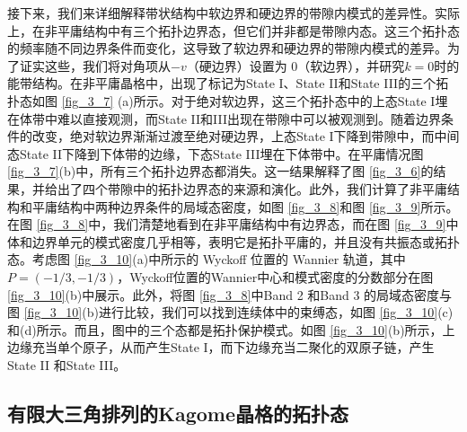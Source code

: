 接下来，我们来详细解释带状结构中软边界和硬边界的带隙内模式的差异性。实际上，在非平庸结构中有三个拓扑边界态，但它们并非都是带隙内态。这三个拓扑态的频率随不同边界条件而变化，这导致了软边界和硬边界的带隙内模式的差异。为了证实这些，我们将对角项从$-v$（硬边界）设置为 0（软边界），并研究$ k = 0 $时的能带结构。在非平庸晶格中，出现了标记为State I、State II和State III的三个拓扑态如图 \ref{fig_3_7} (a)所示。对于绝对软边界，这三个拓扑态中的上态State I埋在体带中难以直接观测，而State II和III出现在带隙中可以被观测到。随着边界条件的改变，绝对软边界渐渐过渡至绝对硬边界，上态State I下降到带隙中，而中间态State II下降到下体带的边缘，下态State III埋在下体带中。在平庸情况图 \ref{fig_3_7}(b)中，所有三个拓扑边界态都消失。这一结果解释了图 \ref{fig_3_6}的结果，并给出了四个带隙中的拓扑边界态的来源和演化。此外，我们计算了非平庸结构和平庸结构中两种边界条件的局域态密度\cite{C3-5}，如图 \ref{fig_3_8}和图 \ref{fig_3_9}所示。在图 \ref{fig_3_8}中，我们清楚地看到在非平庸结构中有边界态，而在图 \ref{fig_3_9}中体和边界单元的模式密度几乎相等，表明它是拓扑平庸的，并且没有共振态或拓扑态。考虑图 \ref{fig_3_10}(a)中所示的 Wyckoff 位置的 Wannier 轨道，其中 $P = (-1/3, -1/3)$，Wyckoff位置的Wannier中心和模式密度的分数部分在图 \ref{fig_3_10}(b)中展示。此外，将图 \ref{fig_3_8}中Band 2 和Band 3 的局域态密度与图 \ref{fig_3_10}(b)进行比较，我们可以找到连续体中的束缚态，如图 \ref{fig_3_10}(c)和(d)所示。而且，图中的三个态都是拓扑保护模式。如图 \ref{fig_3_10}(b)所示，上边缘充当单个原子，从而产生State I，而下边缘充当二聚化的双原子链，产生State II 和State III。

\subsection{有限大三角排列的Kagome晶格的拓扑态}

